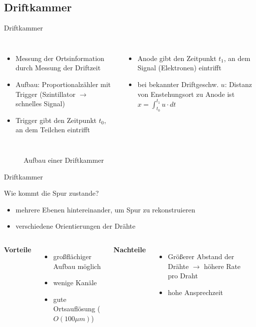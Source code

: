 \subsection[]{Driftkammer}

\begin{frame}{Driftkammer}
    \begin{columns}[T]
	    	\begin{itemize}
	    	  \item Messung der Ortsinformation durch Messung der Driftzeit
			  \item Aufbau: Proportionalzähler mit Trigger (Szintillator $\rightarrow$ schnelles Signal)
			  \item Trigger gibt den Zeitpunkt $t_0$, an dem Teilchen eintrifft
			\end{itemize}
			
	    	\begin{itemize}
			  \item Anode gibt den Zeitpunkt $t_1$, an dem Signal (Elektronen) eintrifft
			  \item bei bekannter Driftgeschw. $u$: Distanz von Enstehungsort zu Anode ist
			  $x=\int_{t_0}^{t_1}u\cdot dt$
			\end{itemize}
    \end{columns}

	\begin{figure}[htbp]
	  	\centering
		
	  	\caption{Aufbau einer Driftkammer}
	\end{figure}
\end{frame}

\begin{frame}{Driftkammer}

	\begin{block}{Wie kommt die Spur zustande?}
		\begin{itemize}
		  \item mehrere Ebenen hintereinander, um Spur zu rekonstruieren
		  \item verschiedene Orientierungen der Drähte
		\end{itemize}
	\end{block}
	\vspace{0.8cm}
    \begin{columns}[T]
			\textbf{Vorteile}		
			\begin{itemize}
			  \item großflächiger Aufbau möglich
			  \item wenige Kanäle
			  \item gute Ortsauflösung ($O(100\mu m)$)
			\end{itemize}	
	    	\textbf{Nachteile}
	    	\begin{itemize}
			  \item Größerer Abstand der Drähte $\rightarrow$ höhere Rate pro Draht 
			  \item hohe Ansprechzeit
			\end{itemize}
    \end{columns}
    \vspace{1cm}
\end{frame}

